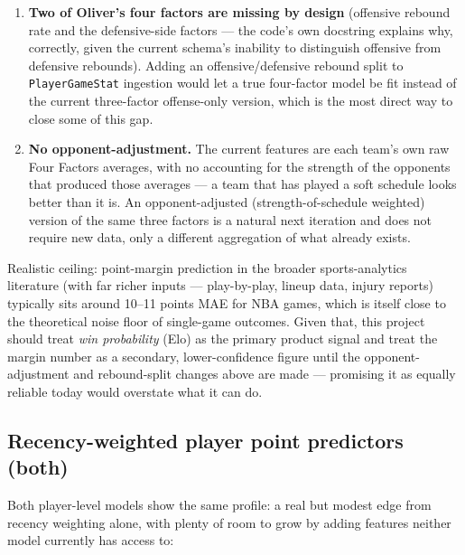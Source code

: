 \documentclass[11pt]{article}
\newcommand{\code}[1]{\allowbreak\texttt{\small #1}\allowbreak}
\begin{document}
\begin{enumerate}
    \item \textbf{Two of Oliver's four factors are missing by design} (offensive rebound rate and the
    defensive-side factors — the code's own docstring explains why, correctly, given the current schema's
    inability to distinguish offensive from defensive rebounds). Adding an offensive/defensive rebound split
    to \code{PlayerGameStat} ingestion would let a true four-factor model be fit instead of the current
    three-factor offense-only version, which is the most direct way to close some of this gap.
    \item \textbf{No opponent-adjustment.} The current features are each team's own raw Four Factors
    averages, with no accounting for the strength of the opponents that produced those averages — a team
    that has played a soft schedule looks better than it is. An opponent-adjusted (strength-of-schedule
    weighted) version of the same three factors is a natural next iteration and does not require new data,
    only a different aggregation of what already exists.
\end{enumerate}

Realistic ceiling: point-margin prediction in the broader sports-analytics literature (with far richer
inputs — play-by-play, lineup data, injury reports) typically sits around 10--11 points MAE for NBA games,
which is itself close to the theoretical noise floor of single-game outcomes. Given that, this project
should treat \emph{win probability} (Elo) as the primary product signal and treat the margin number as a
secondary, lower-confidence figure until the opponent-adjustment and rebound-split changes above are made —
promising it as equally reliable today would overstate what it can do.

\subsection{Recency-weighted player point predictors (both)}

Both player-level models show the same profile: a real but modest edge from recency weighting alone, with
plenty of room to grow by adding features neither model currently has access to:
\end{document}
